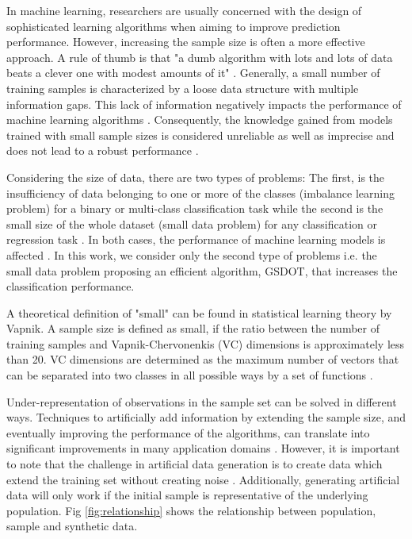 \documentclass[10pt,letterpaper]{article}
\begin{document}
In machine learning, researchers are usually concerned with the design of sophisticated learning algorithms when aiming to improve prediction performance. However, increasing the sample size is often a more effective approach. A rule of thumb is that "a dumb algorithm with lots and lots of data beats a clever one with modest amounts of it" \cite{Domingos.2012}. Generally, a small number of training samples is characterized by a loose data structure with multiple information gaps. This lack of information negatively impacts the performance of machine learning algorithms \cite{Lin.2018}. Consequently, the knowledge gained from models trained with small sample sizes is considered unreliable as well as imprecise and does not lead to a robust performance \cite{AbdulLateh.2017}.

Considering the size of data, there are two types of problems: The first, is the insufficiency of data belonging to one or more of the classes (imbalance learning problem) for a binary or multi-class classification task while the second is the small size of the whole dataset (small data problem) for any classification or regression task \cite{Sezer.2014}. In both cases, the performance of machine learning models is affected \cite{Tsai.2008}. In this work, we consider only the second type of problems i.e. the small data problem proposing an efficient algorithm, GSDOT, that increases the classification performance.

A theoretical definition of "small" can be found in statistical learning theory by Vapnik. A sample size is defined as small, if the ratio between the number of training samples and Vapnik-Chervonenkis (VC) dimensions is approximately less than 20. VC dimensions are determined as the maximum number of vectors that can be separated into two classes in all possible ways by a set of functions \cite{Vapnik.2008}.

Under-representation of observations in the sample set can be solved in different ways. Techniques to artificially add information by extending the sample size, and eventually improving the performance of the algorithms, can translate into significant improvements in many application domains \cite{Sezer.2014}. However, it is important to note that the challenge in artificial data generation is to create data which extend the training set without creating noise \cite{Li.2006}. Additionally, generating artificial data will only work if the initial sample is representative of the underlying population. Fig \ref{fig:relationship} shows the relationship between population, sample and synthetic data.
\end{document}
